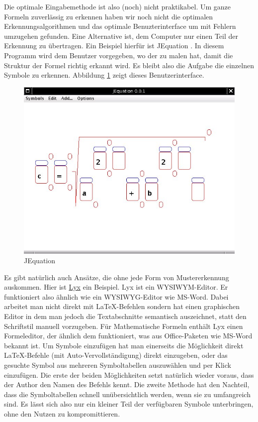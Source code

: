 Die optimale Eingabemethode ist also (noch) nicht praktikabel. Um ganze Formeln zuverlässig zu erkennen haben wir noch nicht die optimalen Erkennungsalgorithmen und das optimale Benuzterinterface um mit Fehlern umzugehen gefunden. Eine Alternative ist, dem Computer nur einen Teil der Erkennung zu übertragen. Ein Beispiel hierfür ist JEquation \cite{jequation}. In diesem Programm wird dem Benutzer vorgegeben, wo der zu malen hat, damit die Struktur der Formel richtig erkannt wird. Es bleibt also die Aufgabe die einzelnen Symbole zu erkennen. Abbildung \ref{fig:jequation} zeigt dieses Benutzerinterface.

\begin{figure}
  \begin{center}
    \includegraphics[width=.8\textwidth]{figures/jequation.png}
  \end{center}
  \caption{JEquation}
  \label{fig:jequation}
\end{figure}

Es gibt natürlich auch Ansätze, die ohne jede Form von Mustererkennung auskommen. Hier ist \href{http://lyx.org}{Lyx} ein Beispiel. Lyx ist ein \ac{WYSIWYM}-Editor. Er funktioniert also ähnlich wie ein \ac{WYSIWYG}-Editor wie MS-Word. Dabei arbeitet man nicht direkt mit \LaTeX-Befehlen sondern hat einen graphischen Editor in dem man jedoch die Textabschnitte semantisch auszeichnet, statt den Schriftstil manuell vorzugeben. Für Mathematische Formeln enthält Lyx einen Formeleditor, der ähnlich dem funktioniert, was aus Office-Paketen wie MS-Word bekannt ist. Um Symbole einzufügen hat man einerseits die Möglichkeit direkt \LaTeX-Befehle (mit Auto-Vervollständigung) direkt einzugeben, oder das gesuchte Symbol aus mehreren Symboltabellen auszuwählen und per Klick einzufügen. Die erste der beiden Möglichkeiten setzt natürlich wieder voraus, dass der Author den Namen des Befehls kennt. Die zweite Methode hat den Nachteil, dass die Symboltabellen schnell unübersichtlich werden, wenn sie zu umfangreich sind. Es lässt sich also nur ein kleiner Teil der verfügbaren Symbole unterbringen, ohne den Nutzen zu kompromittieren.

